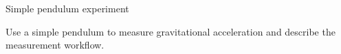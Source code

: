 ﻿\begin{problem}[10]{Simple pendulum experiment}
\begin{expcontent}
Use a simple pendulum to measure gravitational acceleration and describe the measurement workflow.
\end{expcontent}
\end{problem}
